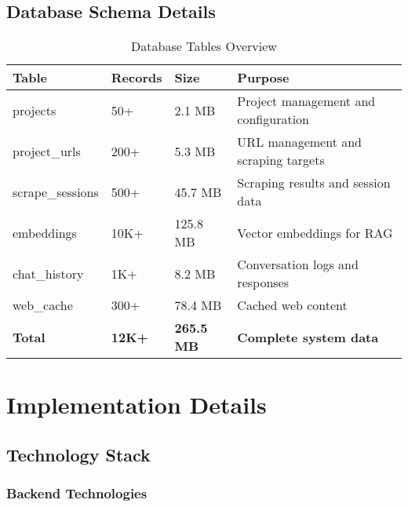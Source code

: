 \documentclass[12pt,a4paper]{report}
\begin{document}
\section{Database Schema Details}

\begin{table}[H]
    \centering
    \caption{Database Tables Overview}
    \label{tab:database-tables}
    \begin{tabular}{|l|l|l|p{4cm}|}
        \hline
        \rowcolor{primaryblue!20}
        \textbf{Table} & \textbf{Records} & \textbf{Size} & \textbf{Purpose} \\
        \hline
        projects & 50+ & 2.1 MB & Project management and configuration \\
        \hline
        project\_urls & 200+ & 5.3 MB & URL management and scraping targets \\
        \hline
        scrape\_sessions & 500+ & 45.7 MB & Scraping results and session data \\
        \hline
        embeddings & 10K+ & 125.8 MB & Vector embeddings for RAG \\
        \hline
        chat\_history & 1K+ & 8.2 MB & Conversation logs and responses \\
        \hline
        web\_cache & 300+ & 78.4 MB & Cached web content \\
        \hline
        \rowcolor{secondarygreen!20}
        \textbf{Total} & \textbf{12K+} & \textbf{265.5 MB} & \textbf{Complete system data} \\
        \hline
    \end{tabular}
\end{table}

\chapter{Implementation Details}

\section{Technology Stack}

\subsection{Backend Technologies}
\end{document}
